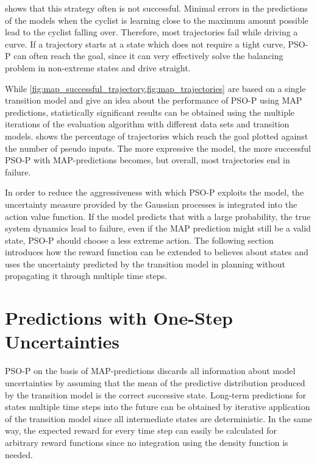  shows that this strategy often is not successful.
Minimal errors in the predictions of the models when the cyclist is learning close to the maximum amount possible lead to the cyclist falling over.
Therefore, most trajectories fail while driving a curve.
If a trajectory starts at a state which does not require a tight curve, PSO-P can often reach the goal, since it can very effectively solve the balancing problem in non-extreme states and drive straight.

While \cref{fig:map_successful_trajectory,fig:map_trajectories} are based on a single transition model and give an idea about the performance of PSO-P using MAP predictions, statistically significant results can be obtained using the multiple iterations of the evaluation algorithm with different data sets and transition models.
  shows the percentage of trajectories which reach the goal plotted against the number of pseudo inputs.
The more expressive the model, the more successful PSO-P with MAP-predictions becomes, but overall, most trajectories end in failure.

In order to reduce the aggressiveness with which PSO-P exploits the model, the uncertainty measure provided by the Gaussian processes is integrated into the action value function.
If the model predicts that with a large probability, the true system dynamics lead to failure, even if the MAP prediction might still be a valid state, PSO-P should choose a less extreme action.
The following section introduces how the reward function can be extended to believes about states and uses the uncertainty predicted by the transition model in planning without propagating it through multiple time steps.

\section{Predictions with One-Step Uncertainties}
PSO-P on the basis of MAP-predictions discards all information about model uncertainties by assuming that the mean of the predictive distribution produced by the transition model is the correct successive state.
Long-term predictions for states multiple time steps into the future can be obtained by iterative application of the transition model since all intermediate states are deterministic.
In the same way, the expected reward for every time step can easily be calculated for arbitrary reward functions since no integration using the density function is needed.


